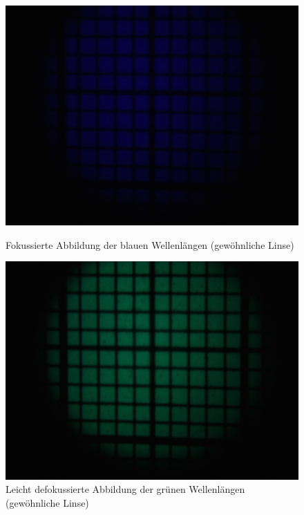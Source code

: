 \begin{figure}[htb]
	\begin{minipage}[t]{0.32\textwidth}
		\includegraphics[clip=true, trim=700px 950px 900px 250px, width=\linewidth]{img/ChromAbb/Prakt_Linsenfehler_2015_06_04_068}
		\caption{Fokussierte Abbildung der blauen Wellenlängen (gewöhnliche Linse)}
		\label{fig:cm_blau}
	\end{minipage}
	\hfill
	\begin{minipage}[t]{0.32\textwidth}
		\includegraphics[clip=true, trim=707px 950px 907px 250px, width=\linewidth]{img/ChromAbb/Prakt_Linsenfehler_2015_06_04_069}
		\caption{Leicht defokussierte Abbildung der grünen Wellenlängen (gewöhnliche Linse)}
		\label{fig:cm_gruen}
	\end{minipage}

\end{figure}
